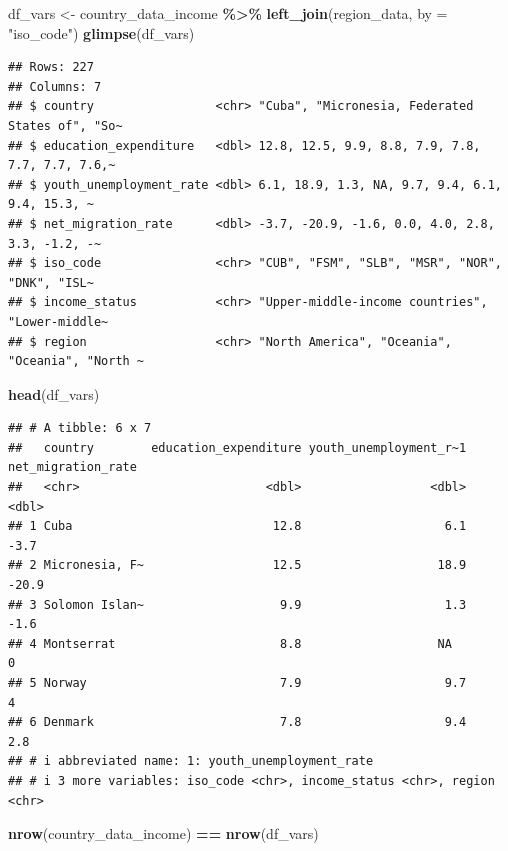 \documentclass[
]{article}
\newenvironment{Shaded}{\begin{snugshade}}{\end{snugshade}}
\newcommand{\AttributeTok}[1]{\textcolor[rgb]{0.13,0.29,0.53}{#1}}
\newcommand{\FunctionTok}[1]{\textcolor[rgb]{0.13,0.29,0.53}{\textbf{#1}}}
\newcommand{\NormalTok}[1]{#1}
\newcommand{\OtherTok}[1]{\textcolor[rgb]{0.56,0.35,0.01}{#1}}
\newcommand{\SpecialCharTok}[1]{\textcolor[rgb]{0.81,0.36,0.00}{\textbf{#1}}}
\newcommand{\StringTok}[1]{\textcolor[rgb]{0.31,0.60,0.02}{#1}}
\begin{document}
\begin{Shaded}
\begin{Highlighting}[]
\NormalTok{df\_vars }\OtherTok{\textless{}{-}}\NormalTok{ country\_data\_income }\SpecialCharTok{\%\textgreater{}\%}
  \FunctionTok{left\_join}\NormalTok{(region\_data, }\AttributeTok{by =} \StringTok{"iso\_code"}\NormalTok{)}
\FunctionTok{glimpse}\NormalTok{(df\_vars)}
\end{Highlighting}
\end{Shaded}

\begin{verbatim}
## Rows: 227
## Columns: 7
## $ country                 <chr> "Cuba", "Micronesia, Federated States of", "So~
## $ education_expenditure   <dbl> 12.8, 12.5, 9.9, 8.8, 7.9, 7.8, 7.7, 7.7, 7.6,~
## $ youth_unemployment_rate <dbl> 6.1, 18.9, 1.3, NA, 9.7, 9.4, 6.1, 9.4, 15.3, ~
## $ net_migration_rate      <dbl> -3.7, -20.9, -1.6, 0.0, 4.0, 2.8, 3.3, -1.2, -~
## $ iso_code                <chr> "CUB", "FSM", "SLB", "MSR", "NOR", "DNK", "ISL~
## $ income_status           <chr> "Upper-middle-income countries", "Lower-middle~
## $ region                  <chr> "North America", "Oceania", "Oceania", "North ~
\end{verbatim}

\begin{Shaded}
\begin{Highlighting}[]
\FunctionTok{head}\NormalTok{(df\_vars)}
\end{Highlighting}
\end{Shaded}

\begin{verbatim}
## # A tibble: 6 x 7
##   country        education_expenditure youth_unemployment_r~1 net_migration_rate
##   <chr>                          <dbl>                  <dbl>              <dbl>
## 1 Cuba                            12.8                    6.1               -3.7
## 2 Micronesia, F~                  12.5                   18.9              -20.9
## 3 Solomon Islan~                   9.9                    1.3               -1.6
## 4 Montserrat                       8.8                   NA                  0  
## 5 Norway                           7.9                    9.7                4  
## 6 Denmark                          7.8                    9.4                2.8
## # i abbreviated name: 1: youth_unemployment_rate
## # i 3 more variables: iso_code <chr>, income_status <chr>, region <chr>
\end{verbatim}

\begin{Shaded}
\begin{Highlighting}[]
\FunctionTok{nrow}\NormalTok{(country\_data\_income) }\SpecialCharTok{==} \FunctionTok{nrow}\NormalTok{(df\_vars)}
\end{Highlighting}
\end{Shaded}
\end{document}
